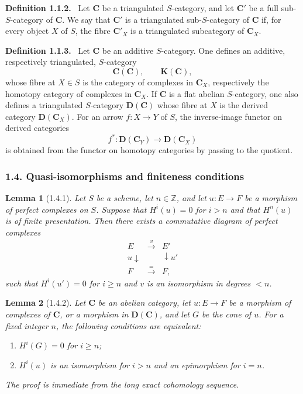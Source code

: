 \documentclass[11pt]{article}
\theoremstyle{plain}
\newtheorem*{lemma*}{Lemma}
\theoremstyle{definition}
\theoremstyle{remark}
\newenvironment{statement}[1]{\par\medskip\noindent\textbf{#1.}\ }{\par\medskip}
\newcommand{\ZZ}{\mathbb Z}
\begin{document}
\begin{statement}{Definition 1.1.2}
Let $\mathbf C$ be a triangulated $S$-category, and let $\mathbf C'$ be a full sub-$S$-category of $\mathbf C$. We say that $\mathbf C'$ is a triangulated sub-$S$-category of $\mathbf C$ if, for every object $X$ of $S$, the fibre $\mathbf C'_X$ is a triangulated subcategory of $\mathbf C_X$.
\end{statement}

\begin{statement}{Definition 1.1.3}
Let $\mathbf C$ be an additive $S$-category. One defines an additive, respectively triangulated, $S$-category
\[
   \mathbf C(\mathbf C),\qquad \mathbf K(\mathbf C),
\]
whose fibre at $X\in S$ is the category of complexes in $\mathbf C_X$, respectively the homotopy category of complexes in $\mathbf C_X$. If $\mathbf C$ is a flat abelian $S$-category, one also defines a triangulated $S$-category $\mathbf D(\mathbf C)$ whose fibre at $X$ is the derived category $\mathbf D(\mathbf C_X)$. For an arrow $f:X\to Y$ of $S$, the inverse-image functor on derived categories
\[
   f^*:\mathbf D(\mathbf C_Y)\longrightarrow\mathbf D(\mathbf C_X)
\]
is obtained from the functor on homotopy categories by passing to the quotient.
\end{statement}

\subsubsection*{1.4. Quasi-isomorphisms and finiteness conditions}

\begin{lemma*}[1.4.1]
Let $S$ be a scheme, let $n\in\ZZ$, and let $u:E\to F$ be a morphism of perfect complexes on $S$. Suppose that $H^i(u)=0$ for $i>n$ and that $H^n(u)$ is of finite presentation. Then there exists a commutative diagram of perfect complexes
\[
\begin{array}{ccc}
E & \xrightarrow{v} & E'\\
u\downarrow & & \downarrow u'\\
F & \xrightarrow{=} & F,
\end{array}
\]
such that $H^i(u')=0$ for $i\ge n$ and $v$ is an isomorphism in degrees $<n$.
\end{lemma*}

\begin{lemma*}[1.4.2]
Let $\mathbf C$ be an abelian category, let $u:E\to F$ be a morphism of complexes of $\mathbf C$, or a morphism in $\mathbf D(\mathbf C)$, and let $G$ be the cone of $u$. For a fixed integer $n$, the following conditions are equivalent:
\begin{enumerate}[label=(\roman*)]
\item $H^i(G)=0$ for $i\ge n$;
\item $H^i(u)$ is an isomorphism for $i>n$ and an epimorphism for $i=n$.
\end{enumerate}
The proof is immediate from the long exact cohomology sequence.
\end{lemma*}
\end{document}
